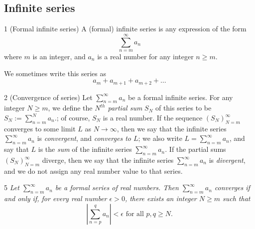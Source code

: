 \subsection{Infinite series}
\begin{definition}{1}
    \label{formal-series}
    (Formal infinite series) A (formal) infinite series is any expression of the
    form
    \begin{equation*}
        \sum_{n=m}^{\infty} a_n
    \end{equation*}
    where $m$ is an integer, and $a_n$ is a real number for any integer $n \geq m$.

    We sometimes write this series as
    \begin{equation*}
        a_m + a_{m+1} + a_{m+2} + \ldots
    \end{equation*}
\end{definition}

\begin{definition}{2}
    \label{series-convergence}
    (Convergence of series) Let $\sum_{n=m}^{\infty} a_n$ be a formal infinite series.
    For any integer $N \geq m$, we define the \emph{$N^{th}$ partial sum} $S_N$ of
    this series to be $S_N := \sum_{n=m}^{N} a_n$.; of course, $S_N$ is a real number.
    If the sequence $(S_N)_{N=m}^{\infty}$ converges to some limit $L$ as $N \rightarrow \infty$,
    then we say that the infinite series $\sum_{n=m}^{\infty} a_n$ is \emph{convergent},
    and \emph{converges to $L$}; we also write $L = \sum_{n=m}^{\infty} a_n$, and
    say that $L$ is the \emph{sum} of  the infinite series $\sum_{n=m}^{\infty} a_n$.
    If the partial sums $(S_N)_{N=m}^{\infty}$ diverge, then we say that the infinite
    series $\sum_{n=m}^{\infty} a_n$ is \emph{divergent}, and we do not assign any
    real number value to that series.
\end{definition}

\begin{proposition}{5}
    \label{series-cauchy-criterion}
    \emph{Let $\sum_{n=m}^{\infty} a_n$ be a formal series of real numbers. Then
    $\sum_{n=m}^{\infty} a_n$ converges if and only if, for every real number
    $\epsilon > 0$, there exists an integer $N \geq m$ such that
    \begin{equation*}
        |\sum_{n=p}^{q} a_n| < \epsilon \text{ for all $p, q \geq N$}.
    \end{equation*}
    }
\end{proposition}

